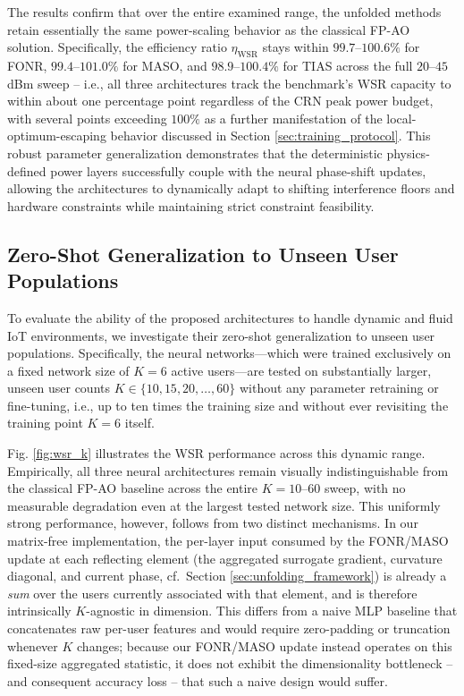 \documentclass[journal]{IEEEtran}
\begin{document}
The results confirm that over the entire examined range, the unfolded methods retain essentially the same power-scaling behavior as the classical FP-AO solution. Specifically, the efficiency ratio $\eta_{\text{WSR}}$ stays within $99.7$--$100.6\%$ for FONR, $99.4$--$101.0\%$ for MASO, and $98.9$--$100.4\%$ for TIAS across the full $20$--$45$ dBm sweep -- i.e., all three architectures track the benchmark's WSR capacity to within about one percentage point regardless of the CRN peak power budget, with several points exceeding $100\%$ as a further manifestation of the local-optimum-escaping behavior discussed in Section \ref{sec:training_protocol}. This robust parameter generalization demonstrates that the deterministic physics-defined power layers successfully couple with the neural phase-shift updates, allowing the architectures to dynamically adapt to shifting interference floors and hardware constraints while maintaining strict constraint feasibility.

\subsection{Zero-Shot Generalization to Unseen User Populations}
\label{subsec:zero_shot_k}

To evaluate the ability of the proposed architectures to handle dynamic and fluid IoT environments, we investigate their zero-shot generalization to unseen user populations. Specifically, the neural networks—which were trained exclusively on a fixed network size of $K=6$ active users—are tested on substantially larger, unseen user counts $K \in \{10, 15, 20, \dots, 60\}$ without any parameter retraining or fine-tuning, i.e., up to ten times the training size and without ever revisiting the training point $K=6$ itself.

Fig. \ref{fig:wsr_k} illustrates the WSR performance across this dynamic range. Empirically, all three neural architectures remain visually indistinguishable from the classical FP-AO baseline across the entire $K=10$--$60$ sweep, with no measurable degradation even at the largest tested network size. This uniformly strong performance, however, follows from two distinct mechanisms. In our matrix-free implementation, the per-layer input consumed by the FONR/MASO update at each reflecting element (the aggregated surrogate gradient, curvature diagonal, and current phase, cf.\ Section \ref{sec:unfolding_framework}) is already a \emph{sum} over the users currently associated with that element, and is therefore intrinsically $K$-agnostic in dimension. This differs from a naive MLP baseline that concatenates raw per-user features and would require zero-padding or truncation whenever $K$ changes; because our FONR/MASO update instead operates on this fixed-size aggregated statistic, it does not exhibit the dimensionality bottleneck -- and consequent accuracy loss -- that such a naive design would suffer.
\end{document}
